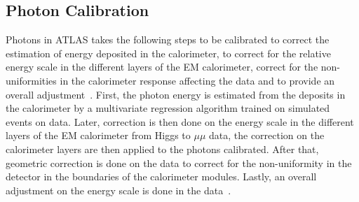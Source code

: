 \subsection{Photon Calibration}
Photons in ATLAS takes the following steps to be calibrated to correct the estimation of energy deposited in the calorimeter, to correct for the relative energy scale in the different layers of the EM calorimeter, correct for the non-uniformities in the calorimeter response affecting the data and to provide an overall adjustment~\cite{gammaCalibration2019}.
First, the photon energy is estimated from the deposits in the calorimeter by a multivariate regression algorithm trained on simulated events on data. Later, correction is then done on the energy scale in the different layers of the EM calorimeter from Higgs to $\mu \mu$ data, the correction on the calorimeter layers are then applied to the photons calibrated. After that, geometric correction is done on the data to correct for the non-uniformity in the detector in the boundaries of the calorimeter modules. Lastly, an overall adjustment on the energy scale is done in the data~\cite{gammaCalibration2019}.

